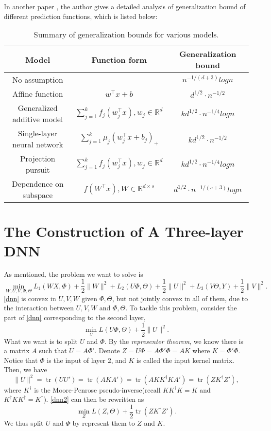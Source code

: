 \documentclass{article}
\DeclareMathOperator{\tr}{tr}
\begin{document}
In another paper \cite{oseledets2009breaking}, the author gives a detailed analysis of generalization bound of different prediction functions, which is listed below:
\begin{table}[htb]
	\begin{tabular}{|c|c|c|}
		\hline
		Model & Function form & Generalization bound\\
		\hline
		No assumption & & $n^{-1/(d+3)}log n$\\
		\hline
		Affine function & $w^\top x + b$ & $d^{1/2}\cdot n^{-1/2}$\\
		\hline
		Generalized additive model & $\sum_{j=1}^{k}f_{j}(w_{j}^\top x),w_{j}\in \mathbb{R}^{d}$ & $k d^{1/2}\cdot n^{-1/4}log n$\\
		\hline
		Single-layer neural network & $\sum_{j=1}^{k} \mu_{j} (w_{j}^\top x + b_{j})_{+}$ & $k d^{1/2} \cdot n^{-1/2}$\\
		\hline
		Projection pursuit & $\sum_{j=1}^{k} f_{j}(w_{j}^\top x), w_{j} \in \mathbb{R}^{d}$ & $k d^{1/2}\cdot n^{-1/4}log n$\\
		\hline
		Dependence on subspace & $f(W^\top x), W \in \mathbb{R}^{d \times s}$ & $d^{1/2}\cdot n^{-1/(s+3)}log n$\\
		\hline
	\end{tabular}
	\caption{Summary of generalization bounds for various models.}
\end{table}
\section{The Construction of A Three-layer DNN}
As mentioned, the problem we want to solve is 
\begin{equation}\label{dnn}
\min_{W,U,V,\Phi,\Theta}L_1(WX,\Phi)+\frac{1}{2}\|W\|^2+L_2(U\Phi,\Theta)+\frac{1}{2}\|U\|^2+L_3(V\Theta,Y)+\frac{1}{2}\|V\|^2.
\end{equation}
\eqref{dnn} is convex in $U,V,W$ given $\Phi,\Theta$, but not jointly convex in all of them, due to the interaction between $U,V,W$ and $\Phi,\Theta$. To tackle this problem, \cite{aslan2013convex} consider the part of \eqref{dnn} corresponding to the second layer,
\begin{equation}\label{dnn2}
	\min_U L(U\Phi,\Theta)+\frac{1}{2}\|U\|^2.
\end{equation}
What we want is to split $U$ and $\Phi$. By the \emph{representer theorem}, we know there is a matrix $A$ such that $U=A\Phi'$. Denote $Z=U\Phi=A\Phi'\Phi=AK$ where $K=\Phi'\Phi$. Notice that $\Phi$ is the input of layer 2, and $K$ is called the input kernel matrix. Then, we have 
\[\|U\|^2=\tr(UU')=\tr(AKA')=\tr(AKK^\dagger KA')=\tr(ZK^\dagger Z'),\]
where $K^\dagger$ is the Moore-Penrose pseudo-inverse(recall $KK^\dagger K=K$ and $K^\dagger KK^\dagger=K^\dagger$). \eqref{dnn2} can then be rewritten as
\begin{equation}\label{dnn3}
	\min_Z L(Z,\Theta)+\frac{1}{2}\tr(ZK^\dagger Z').
\end{equation}
We thus split $U$ and $\Phi$ by represent them to $Z$ and $K$.
\end{document}
